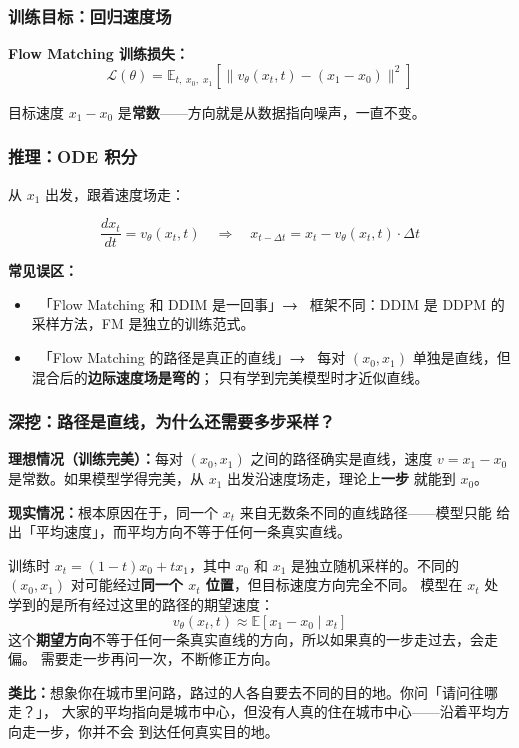 \subsubsection*{训练目标：回归速度场}

\begin{conceptbox}
\textbf{Flow Matching 训练损失：}
$$\mathcal{L}(\theta) = \mathbb{E}_{t,\; x_0,\; x_1}\!\left[
  \|v_\theta(x_t, t) - (x_1 - x_0)\|^2\right]$$

目标速度 $x_1 - x_0$ 是\textbf{常数}——方向就是从数据指向噪声，一直不变。
\end{conceptbox}

\subsubsection*{推理：ODE 积分}

从 $x_1$ 出发，跟着速度场走：

$$\frac{dx_t}{dt} = v_\theta(x_t, t)
  \quad\Longrightarrow\quad
  x_{t - \Delta t} = x_t - v_\theta(x_t, t) \cdot \Delta t$$

\begin{warnbox}
\textbf{常见误区：}
\begin{itemize}
  \item {}~「Flow Matching 和 DDIM 是一回事」\;\textbf{→}\;
        ~框架不同：DDIM 是 DDPM 的采样方法，FM 是独立的训练范式。
  \item {}~「Flow Matching 的路径是真正的直线」\;\textbf{→}\;
        ~每对 $(x_0, x_1)$ 单独是直线，但混合后的\textbf{边际速度场是弯的}；
        只有学到完美模型时才近似直线。
\end{itemize}
\end{warnbox}

\subsubsection*{深挖：路径是直线，为什么还需要多步采样？}

\begin{intubox}
\textbf{理想情况（训练完美）：}每对 $(x_0, x_1)$ 之间的路径确实是直线，速度
$v = x_1 - x_0$ 是常数。如果模型学得完美，从 $x_1$ 出发沿速度场走，理论上\textbf{一步}
就能到 $x_0$。

\medskip
\textbf{现实情况：}根本原因在于，同一个 $x_t$ 来自无数条不同的直线路径——模型只能
给出「平均速度」，而平均方向不等于任何一条真实直线。

\medskip
训练时 $x_t = (1-t)x_0 + tx_1$，其中 $x_0$ 和 $x_1$ 是独立随机采样的。不同的
$(x_0, x_1)$ 对可能经过\textbf{同一个 $x_t$ 位置}，但目标速度方向完全不同。
模型在 $x_t$ 处学到的是所有经过这里的路径的期望速度：
$$v_\theta(x_t, t) \approx \mathbb{E}[x_1 - x_0 \mid x_t]$$
这个\textbf{期望方向}不等于任何一条真实直线的方向，所以如果真的一步走过去，会走偏。
需要走一步再问一次，不断修正方向。

\medskip
\textbf{类比：}想象你在城市里问路，路过的人各自要去不同的目的地。你问「请问往哪走？」，
大家的平均指向是城市中心，但没有人真的住在城市中心——沿着平均方向走一步，你并不会
到达任何真实目的地。
\end{intubox}

